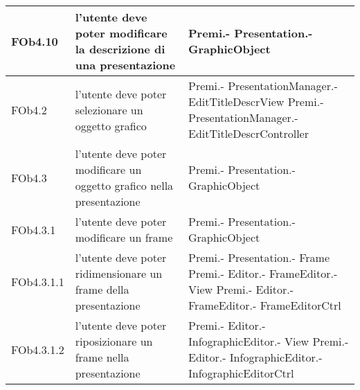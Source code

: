 \begin{longtable}{|l|p{5cm}|p{4cm}|}
\hline
FOb4.10 & l'utente deve poter modificare la descrizione di una presentazione & Premi.- \linebreak Presentation.- \linebreak GraphicObject \linebreak \\
\hline
FOb4.2 & l'utente deve poter selezionare un oggetto grafico & Premi.- \linebreak PresentationManager.- \linebreak EditTitleDescrView \linebreak Premi.- \linebreak PresentationManager.- \linebreak EditTitleDescrController \linebreak \\
\hline
FOb4.3 & l'utente deve poter modificare un oggetto grafico nella presentazione & Premi.- \linebreak Presentation.- \linebreak GraphicObject \linebreak \\
\hline
FOb4.3.1 & l'utente deve poter modificare un frame & Premi.- \linebreak Presentation.- \linebreak GraphicObject \linebreak \\
\hline
FOb4.3.1.1 & l'utente deve poter ridimensionare un frame della presentazione & Premi.- \linebreak Presentation.- \linebreak Frame \linebreak Premi.- \linebreak Editor.- \linebreak FrameEditor.- \linebreak View \linebreak Premi.- \linebreak Editor.- \linebreak FrameEditor.- \linebreak FrameEditorCtrl \linebreak \\
\hline
FOb4.3.1.2 & l'utente deve poter riposizionare un frame nella presentazione & Premi.- \linebreak Editor.- \linebreak InfographicEditor.- \linebreak View \linebreak Premi.- \linebreak Editor.- \linebreak InfographicEditor.- \linebreak InfographicEditorCtrl \linebreak \\

\end{longtable}
